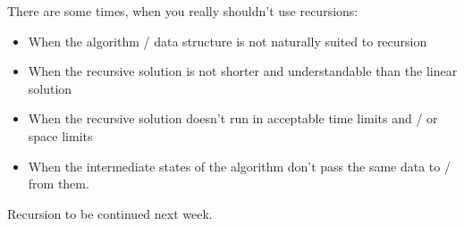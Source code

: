 There are some times, when you really shouldn't use recursions:
\begin{itemize}
    \item When the algorithm / data structure is not naturally suited to recursion
    \item When the recursive solution is not shorter and understandable than the linear solution
    \item When the recursive solution doesn't run in acceptable time limits and / or space limits
    \item When the intermediate states of the algorithm don't pass the same data to / from them.
\end{itemize}

Recursion to be continued next week. 